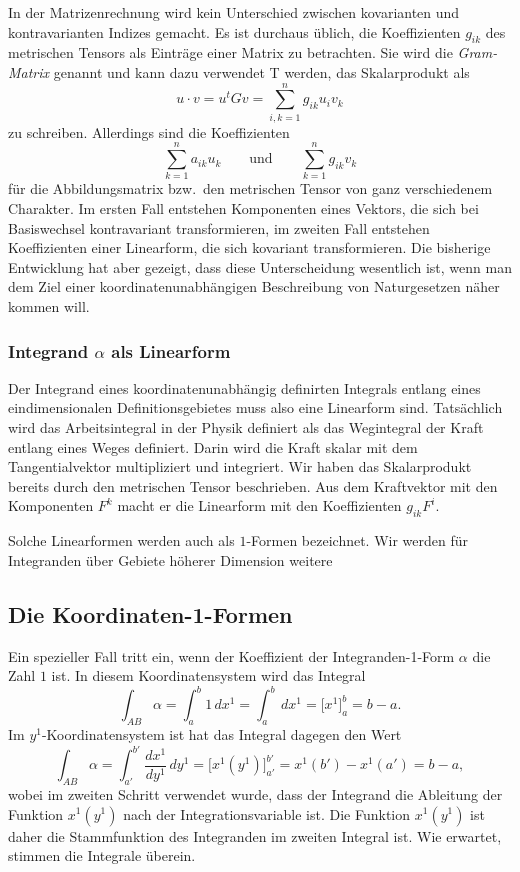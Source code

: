 In der Matrizenrechnung wird kein Unterschied zwischen kovarianten
und kontravarianten Indizes gemacht.
%
%
Es ist durchaus üblich, die Koeffizienten $g_{ik}$ des metrischen
Tensors als Einträge einer Matrix zu betrachten.
Sie wird die {\em Gram-Matrix} genannt und kann dazu verwendet
T
werden, das Skalarprodukt als 
\[
u\cdot v
=
u^t G v
=
\sum_{i,k=1}^n
g_{ik}u_iv_k
\]
zu schreiben.
Allerdings sind die Koeffizienten
\[
\sum_{k=1}^n a_{ik}u_k
\qquad\text{und}\qquad
\sum_{k=1}^n g_{ik}v_k
\]
für die Abbildungsmatrix bzw.~den metrischen Tensor von ganz verschiedenem
Charakter.
Im ersten Fall entstehen Komponenten eines Vektors, die sich bei Basiswechsel
kontravariant transformieren, im zweiten Fall entstehen Koeffizienten
einer Linearform, die sich kovariant transformieren.
Die bisherige Entwicklung hat aber gezeigt, dass diese Unterscheidung
wesentlich ist, wenn man dem Ziel einer koordinatenunabhängigen
Beschreibung von Naturgesetzen näher kommen will.

%
%
\subsubsection{Integrand $\alpha$ als Linearform}
Der Integrand eines koordinatenunabhängig definirten Integrals entlang
eines eindimensionalen Definitionsgebietes muss also eine
Linearform sind.
Tatsächlich wird das Arbeitsintegral in der Physik definiert als
das Wegintegral der Kraft entlang eines Weges definiert.
%
Darin wird die Kraft skalar mit dem Tangentialvektor multipliziert
und integriert.
Wir haben das Skalarprodukt bereits durch den metrischen Tensor
beschrieben.
Aus dem Kraftvektor mit den Komponenten $F^k$ macht er die Linearform
mit den Koeffizienten $g_{ik}F^i$.

Solche Linearformen werden auch als $1$-Formen bezeichnet.
Wir werden für Integranden über Gebiete höherer Dimension weitere

%
%
\subsection{Die Koordinaten-1-Formen}
Ein spezieller Fall tritt ein, wenn der Koeffizient der Integranden-1-Form
$\alpha$ die Zahl $1$ ist.
In diesem Koordinatensystem wird das Integral
\[
\int_{AB} \alpha
=
\int_{a}^{b} 1\, dx^1
=
\int_{a}^b\,dx^1
=
\bigl[ x^1 \bigr]_a^b
=
b-a.
\]
Im $y^1$-Koordinatensystem ist hat das Integral dagegen den Wert
\begin{equation}
\int_{AB}\alpha
=
\int_{a'}^{b'} \frac{dx^1}{dy^1}\,dy^1
=
\bigl[x^1(y^1)\bigr]_{a'}^{b'}
=
x^1(b') - x^1(a')
=
b-a,
\label{buch:kurvenintegral:1formen:eqn:hauptsatz}
\end{equation}
wobei im zweiten Schritt verwendet wurde, dass der Integrand die
Ableitung der Funktion $x^1(y^1)$ nach der Integrationsvariable ist.
Die Funktion $x^1(y^1)$ ist daher die
Stammfunktion des Integranden im zweiten Integral ist.
%
Wie erwartet, stimmen die Integrale überein.

